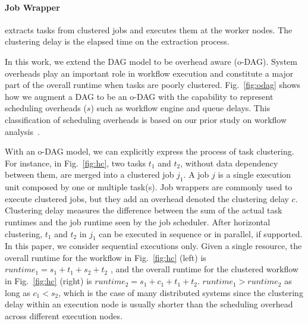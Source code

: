 \documentclass[final]{IEEEtran}
\begin{document}
\paragraph{Job Wrapper} extracts tasks from clustered jobs and executes them at the worker nodes. The clustering delay is the  elapsed time on the extraction process.

In this work, we extend the DAG model to be overhead aware (o-DAG). System overheads play an important role in workflow execution and constitute a major part of the overall runtime when tasks are poorly clustered. Fig.~\ref{fig:odag} shows how we augment a DAG to be an o-DAG with the capability to represent scheduling overheads ($s$) such as workflow engine and queue delays. This classification of scheduling overheads is based on our prior study on workflow analysis~\cite{Chen}. 




With an o-DAG model, we can explicitly express the process of task clustering. For instance, in Fig.~\ref{fig:hc}, two tasks $t_1$ and $t_2$, without data dependency between them, are merged into a clustered job $j_1$. A job $j$ is a single execution unit composed by one or multiple task(s). Job wrappers are commonly used to execute clustered jobs, but they add an overhead denoted the clustering delay $c$. 
Clustering delay measures the difference between the sum of the actual task runtimes and the job runtime seen by the job scheduler. 
After horizontal clustering, $t_1$ and $t_2$ in $j_1$ can be executed in sequence or in parallel, if supported. In this paper, we consider sequential executions only. Given a single resource, the overall runtime for the workflow in Fig.~\ref{fig:hc} (left) is $runtime_1=s_1+t_1+s_2+t_2$ , and the overall runtime for the clustered workflow in Fig.~\ref{fig:hc} (right) is $runtime_2=s_1+c_1+t_1+t_2$.  $runtime_1 > runtime_2$ as long as $c_1 < s_2$, which is the case of many distributed systems since the clustering delay within an execution node is usually shorter than the scheduling overhead across different execution nodes.
\end{document}
